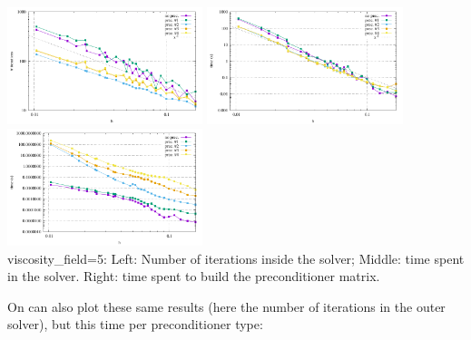 \begin{center} 
\includegraphics[width=5.7cm]{python_codes/fieldstone_16/results/visc_field_5/niterations.pdf}
\includegraphics[width=5.7cm]{python_codes/fieldstone_16/results/visc_field_5/solve_time.pdf}
\includegraphics[width=5.7cm]{python_codes/fieldstone_16/results/visc_field_5/build_precond.pdf}\\
{\captionfont viscosity\_field=5: Left: Number of iterations inside the solver; 
Middle: time spent in the solver.
Right: time spent to build the preconditioner matrix.}
\end{center} 


\newpage

On can also plot these same results (here the number of iterations in the outer solver), 
but this time per preconditioner type:

